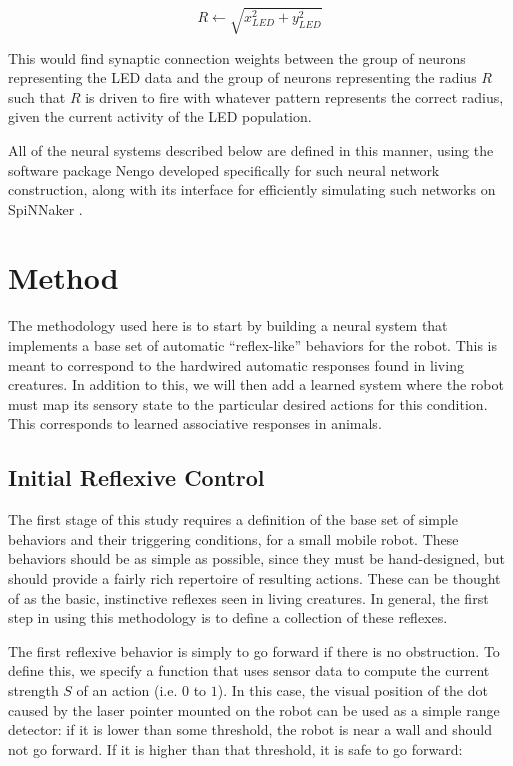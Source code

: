 \documentclass{frontiersSCNS}
\begin{document}
\begin{equation}
    R \leftarrow \sqrt{x_{LED}^2 + y_{LED}^2}
\end{equation}

This would find synaptic connection weights between the group of neurons 
representing the LED data and the group of neurons representing the 
radius $R$ such that $R$ is driven to fire with whatever pattern represents 
the correct radius, given the current activity of the LED population. 



All of the neural systems described below are defined in this manner, using
the software package Nengo \citep{bekolay_nengo2014} developed specifically
for such neural network construction, along with its interface
for efficiently simulating such networks on SpiNNaker \citep{mundy2015}.

\section{Method}

The methodology used here is to start by building a neural system that
implements a base set of automatic ``reflex-like'' behaviors for the robot.
This is meant to correspond to the hardwired automatic responses found in
living creatures.  In addition to this, we will then add a learned system
where the robot must map its sensory state to the particular desired actions
for this condition.  This corresponds to learned associative responses
in animals.

\subsection{Initial Reflexive Control}
The first stage of this study requires a definition of the base set of simple 
behaviors and their triggering conditions, for a small mobile robot. These 
behaviors should be as simple as possible, since they must be hand-designed, 
but should provide a fairly rich repertoire of resulting actions. These can be 
thought of as the basic, instinctive reflexes seen in living creatures. In
general, the first step in using this methodology is to define a collection
of these reflexes.

The first reflexive behavior is simply to go forward if there is no 
obstruction. To define this, we specify a function that uses sensor data to 
compute the current strength $S$ of an action (i.e. $0$ to $1$). In this 
case, the visual position of the dot caused by the laser pointer mounted on
the robot can be used as a simple range 
detector: if it is lower than some threshold, the robot is near a wall and 
should not go forward. If it is higher than that threshold, it is safe to 
go forward: 
\end{document}
